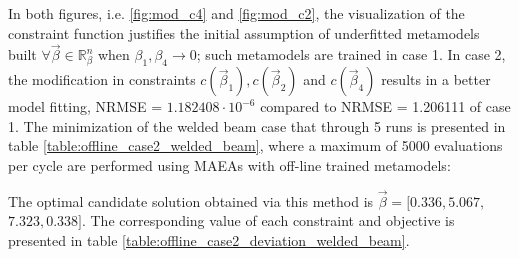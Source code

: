 In both figures, i.e. \ref{fig:mod_c4} and \ref{fig:mod_c2},
the visualization of the constraint function justifies the 
initial assumption of underfitted metamodels built $\forall 
\vec{β} \in \mathbb{R}^n_{β}$ when $β_{1}, β_{4} \rightarrow 0$; 
such metamodels are trained in case 1. In case 2, the modification 
in constraints $c(\vec{β}_{1}), c(\vec{β}_{2})$ and $c(\vec{β}
_{4})$ results in a better model fitting, NRMSE = $1.182408 \!
\cdot \! 10^{-6}$ compared to NRMSE = 1.206111 of case 1. 
The minimization of the welded beam case that through 5 runs is 
presented in table \ref{table:offline_case2_welded_beam}, where a 
maximum of 5000 evaluations per cycle are performed using MAEAs 
with off-line trained metamodels:

\begin{table}[h!]
\centering
\caption{Optimization of welded beam design using MAEAs with 
off-line training}
\label{table:offline_case2_welded_beam}
\end{table}

\newpage


The optimal candidate solution obtained via this method is 
$\vec{β} = [0.336, 5.067,$ $7.323, 0.338]$. The corresponding 
value of each constraint and objective is presented in table 
\ref{table:offline_case2_deviation_welded_beam}.

\begin{table}[h!]
\centering
\caption{\textbf{C}, \textbf{F} responses to $\vec{β}$ found 
via MAEAs with off-line training in case 2}
\label{table:offline_case2_deviation_welded_beam}
\end{table}

